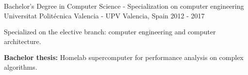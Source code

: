 \begin{cventries}

\cventry
{Bachelor's Degree in Computer Science  - Specialization on computer engineering} %
{Universitat Politécnica Valencia - UPV} %
{Valencia, Spain} %
{2012 - 2017} %
{ 
\begin{cvitems}
\item {Specialized on the elective branch: computer engineering and computer architecture.
\item \textbf{Bachelor thesis:} Homelab supercomputer for performance analysis on complex algorithms.}
\end{cvitems}
}

\end{cventries}
